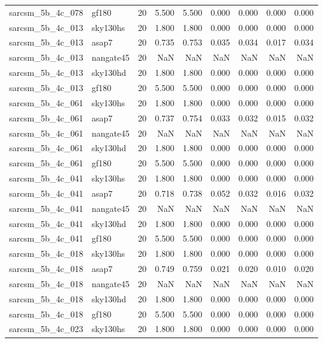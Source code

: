 \begin{tabular}{llrrrrrrr}
sarcsm\_5b\_4c\_078 & gf180 & 20 & 5.500 & 5.500 & 0.000 & 0.000 & 0.000 & 0.000 \\
sarcsm\_5b\_4c\_013 & sky130hs & 20 & 1.800 & 1.800 & 0.000 & 0.000 & 0.000 & 0.000 \\
sarcsm\_5b\_4c\_013 & asap7 & 20 & 0.735 & 0.753 & 0.035 & 0.034 & 0.017 & 0.034 \\
sarcsm\_5b\_4c\_013 & nangate45 & 20 & NaN & NaN & NaN & NaN & NaN & NaN \\
sarcsm\_5b\_4c\_013 & sky130hd & 20 & 1.800 & 1.800 & 0.000 & 0.000 & 0.000 & 0.000 \\
sarcsm\_5b\_4c\_013 & gf180 & 20 & 5.500 & 5.500 & 0.000 & 0.000 & 0.000 & 0.000 \\
sarcsm\_5b\_4c\_061 & sky130hs & 20 & 1.800 & 1.800 & 0.000 & 0.000 & 0.000 & 0.000 \\
sarcsm\_5b\_4c\_061 & asap7 & 20 & 0.737 & 0.754 & 0.033 & 0.032 & 0.015 & 0.032 \\
sarcsm\_5b\_4c\_061 & nangate45 & 20 & NaN & NaN & NaN & NaN & NaN & NaN \\
sarcsm\_5b\_4c\_061 & sky130hd & 20 & 1.800 & 1.800 & 0.000 & 0.000 & 0.000 & 0.000 \\
sarcsm\_5b\_4c\_061 & gf180 & 20 & 5.500 & 5.500 & 0.000 & 0.000 & 0.000 & 0.000 \\
sarcsm\_5b\_4c\_041 & sky130hs & 20 & 1.800 & 1.800 & 0.000 & 0.000 & 0.000 & 0.000 \\
sarcsm\_5b\_4c\_041 & asap7 & 20 & 0.718 & 0.738 & 0.052 & 0.032 & 0.016 & 0.032 \\
sarcsm\_5b\_4c\_041 & nangate45 & 20 & NaN & NaN & NaN & NaN & NaN & NaN \\
sarcsm\_5b\_4c\_041 & sky130hd & 20 & 1.800 & 1.800 & 0.000 & 0.000 & 0.000 & 0.000 \\
sarcsm\_5b\_4c\_041 & gf180 & 20 & 5.500 & 5.500 & 0.000 & 0.000 & 0.000 & 0.000 \\
sarcsm\_5b\_4c\_018 & sky130hs & 20 & 1.800 & 1.800 & 0.000 & 0.000 & 0.000 & 0.000 \\
sarcsm\_5b\_4c\_018 & asap7 & 20 & 0.749 & 0.759 & 0.021 & 0.020 & 0.010 & 0.020 \\
sarcsm\_5b\_4c\_018 & nangate45 & 20 & NaN & NaN & NaN & NaN & NaN & NaN \\
sarcsm\_5b\_4c\_018 & sky130hd & 20 & 1.800 & 1.800 & 0.000 & 0.000 & 0.000 & 0.000 \\
sarcsm\_5b\_4c\_018 & gf180 & 20 & 5.500 & 5.500 & 0.000 & 0.000 & 0.000 & 0.000 \\
sarcsm\_5b\_4c\_023 & sky130hs & 20 & 1.800 & 1.800 & 0.000 & 0.000 & 0.000 & 0.000 \\

\end{tabular}
